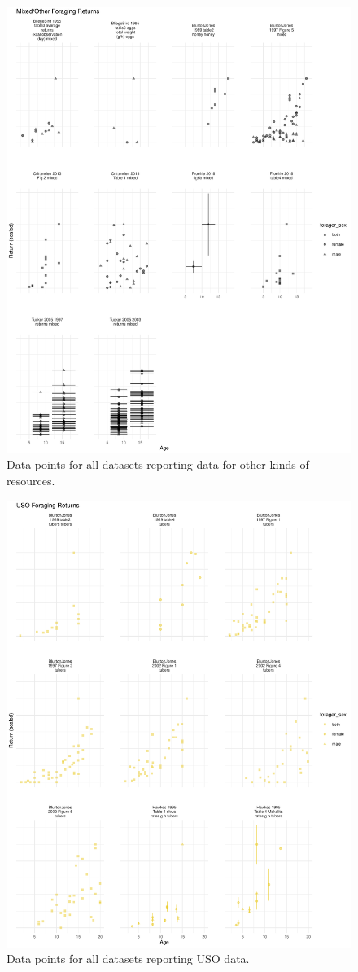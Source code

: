 \begin{figure}[h]
\centering
\includegraphics[width=12cm] {text/images/supplementary/other_data.pdf}
\renewcommand{\thefigure}{S\arabic{figure}}
\caption{Data points for all datasets reporting data for other kinds of resources.}
\label{fig:other}
\end{figure}

\begin{figure}[h]
\centering
\includegraphics[width=12cm] {text/images/supplementary/USO_data.pdf}
\renewcommand{\thefigure}{S\arabic{figure}}
\caption{Data points for all datasets reporting USO data.}
\label{fig:USO}
\end{figure}